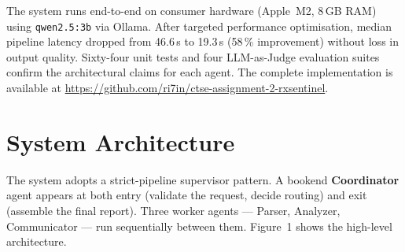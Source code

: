 \documentclass[11pt]{article}
\begin{document}
The system runs end-to-end on consumer hardware (Apple~M2, 8\,GB RAM)
using \texttt{qwen2.5:3b} via Ollama. After targeted performance
optimisation, median pipeline latency dropped from 46.6\,s to 19.3\,s
(58\,\% improvement) without loss in output quality. Sixty-four unit
tests and four LLM-as-Judge evaluation suites confirm the architectural
claims for each agent. The complete implementation is available at
\url{https://github.com/ri7in/ctse-assignment-2-rxsentinel}.

\section*{System Architecture}\label{arch}

The system adopts a strict-pipeline supervisor pattern. A bookend
\textbf{Coordinator} agent appears at both entry (validate the request,
decide routing) and exit (assemble the final report). Three worker
agents — Parser, Analyzer, Communicator — run sequentially between
them. Figure~1 shows the high-level architecture.
\end{document}
